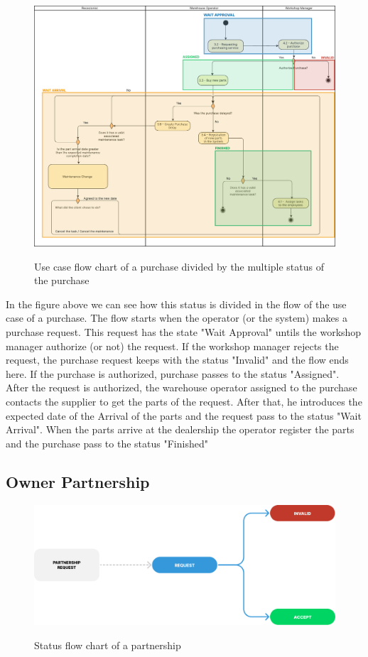 \begin{figure}[h]
  \caption{Use case flow chart of a purchase divided by the multiple status of the purchase}
  \centering
  \includegraphics[width=\textwidth]{figs/Status/Purchase/UseCaseStatus}
  \label{fig:figure2}
\end{figure}

In the figure above we can see how this status is divided in the flow of the use case of a purchase.
The flow starts when the operator (or the system) makes a purchase request. This request has the state "Wait Approval" untils the workshop manager authorize (or not) the request.
If the workshop manager rejects the request, the purchase request keeps with the status "Invalid" and the flow ends here. If the purchase is authorized, purchase passes to the status "Assigned".
After the request is authorized, the warehouse operator assigned to the purchase contacts the supplier to get the parts of the request.
After that, he introduces the expected date of the Arrival of the parts and the request pass to the status "Wait Arrival".
When the parts arrive at the dealership the operator register the parts and the purchase pass to the status "Finished"


\subsection{Owner Partnership} 



\begin{figure}[h]
  \caption{Status flow chart of a partnership}
  \centering
  \includegraphics[width=\textwidth]{figs/Status/OwnerPartnership_StatusDiagram}
  \label{fig:figure2}
\end{figure}

